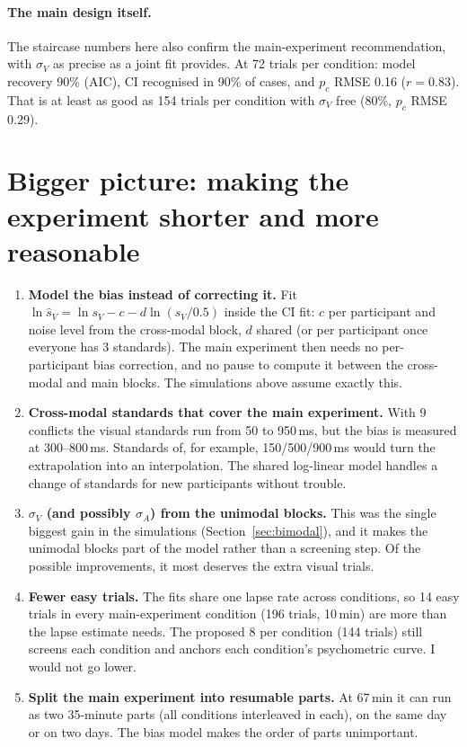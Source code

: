 \documentclass[11pt,a4paper]{article}
\begin{document}
\paragraph{The main design itself.} The staircase numbers here also confirm the main-experiment recommendation, with $\sigma_V$ as precise as a joint fit provides. At 72 trials per condition: model recovery 90\% (AIC), CI recognised in 90\% of cases, and $p_c$ RMSE 0.16 ($r = 0.83$). That is at least as good as 154 trials per condition with $\sigma_V$ free (80\%, $p_c$ RMSE 0.29).

\section{Bigger picture: making the experiment shorter and more reasonable}\label{sec:ideas}
\begin{enumerate}
\item \textbf{Model the bias instead of correcting it.} Fit $\ln\hat s_V = \ln s_V - c - d\ln(s_V/0.5)$ inside the CI fit: $c$ per participant and noise level from the cross-modal block, $d$ shared (or per participant once everyone has 3 standards). The main experiment then needs no per-participant bias correction, and no pause to compute it between the cross-modal and main blocks. The simulations above assume exactly this.
\item \textbf{Cross-modal standards that cover the main experiment.} With 9 conflicts the visual standards run from 50 to 950\,ms, but the bias is measured at 300--800\,ms. Standards of, for example, 150/500/900\,ms would turn the extrapolation into an interpolation. The shared log-linear model handles a change of standards for new participants without trouble.
\item \textbf{$\sigma_V$ (and possibly $\sigma_A$) from the unimodal blocks.} This was the single biggest gain in the simulations (Section~\ref{sec:bimodal}), and it makes the unimodal blocks part of the model rather than a screening step. Of the possible improvements, it most deserves the extra visual trials.
\item \textbf{Fewer easy trials.} The fits share one lapse rate across conditions, so 14 easy trials in every main-experiment condition (196 trials, 10\,min) are more than the lapse estimate needs. The proposed 8 per condition (144 trials) still screens each condition and anchors each condition's psychometric curve. I would not go lower.
\item \textbf{Split the main experiment into resumable parts.} At 67\,min it can run as two 35-minute parts (all conditions interleaved in each), on the same day or on two days. The bias model makes the order of parts unimportant.

\end{enumerate}
\end{document}
